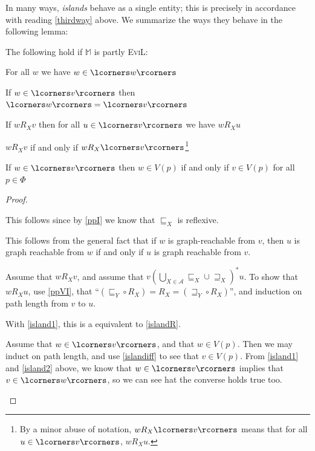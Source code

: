 In many ways, \emph{islands} behave as a single entity;  this is
precisely in accordance with reading \ref{thirdway} above.
We summarize the ways they behave in the following lemma:
\pagebreak
\begin{lemma}\label{island}
The following hold if $\mathbb{M}$ is partly \textsc{EviL}:
\begin{mynum}
	\item\label{island1} For all $w$ we have $w \in \lcorners w\rcorners$
	\item\label{island2} If $w \in \lcorners v\rcorners$ then $\lcorners w\rcorners = \lcorners v\rcorners$
	\item \label{islandR} If $w R_X v$ then for all $u \in \lcorners v\rcorners$
          we have $w R_X u$
\item \label{islandR2} $w R_X v$ if and only if $w R_X \lcorners v
  \rcorners$\footnote{By a minor abuse of notation, 
 $w R_X \lcorners
     v\rcorners$ means that for all $u \in \lcorners v \rcorners$, $w
     R_X u$.
}
	\item \label{islandletters} If $w \in \lcorners v\rcorners$ then $w\in V(p)$ if and only if $v \in V(p)$ for all $p \in \Phi$
\end{mynum}
\end{lemma}
\begin{proof} \ \\
\begin{mynum}
\item This follows since by \ref{ppI} we know that $\sqsubseteq_X$ is
  reflexive.
\item This follows from the general fact that if $w$ is graph-reachable from
  $v$, then $u$ is graph reachable from $w$ if and only if $u$ is
  graph reachable from $v$.
\item Assume that $w R_X v$, and assume that $v \left(\bigcup_{X \in
      \mathcal{A}} \sqsubseteq_X \cup \sqsupseteq_X \right)^\ast u$.
  To show that $w R_X u$, use \ref{ppVI}, that ``$(\sqsubseteq_Y \circ R_X) = R_X =
    (\sqsupseteq_Y \circ R_X)$'', and induction on path length from
    $v$ to $u$.
\item With \ref{island1}, this is a equivalent to \ref{islandR}.
\item Assume that $w \in \lcorners v \rcorners$, and that $w \in
  V(p)$.  Then we may induct on path length, and use \ref{islandiff}
  to see that $v \in V(p)$.  From \ref{island1} and \ref{island2}
  above, we know that $w \in \lcorners v \rcorners$ implies that $v
  \in \lcorners w \rcorners$, so we can see hat the converse holds
  true too.
\end{mynum}
\end{proof}

